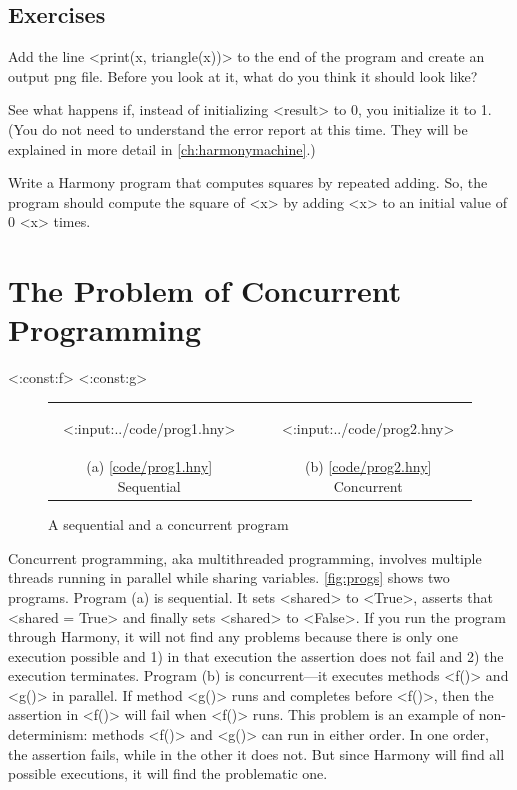 \documentclass{report}
\newcommand{\harmonylink}[1]{%
[\href{https://harmony.cs.cornell.edu/#1}{\underline{#1}}]%
}
\begin{document}
\section*{Exercises}
\begin{problems}
\item Add the line <{print(x, triangle(x))}> to the end of the
program and create an output png file.  Before you look at it, what
do you think it should look like?
\item See what happens if, instead of initializing <{result}> to 0,
you initialize it to 1.  (You do not need to understand the error report at this time.  They will be explained in more detail in \autoref{ch:harmonymachine}.)
\item Write a Harmony program that computes squares by repeated adding.  So, the program
should compute the square of <{x}> by adding <{x}> to an initial value of 0 <{x}> times.
\end{problems}

\chapter{The Problem of Concurrent Programming}
\label{ch:concurrent}

<{:const:f}>
<{:const:g}>

\begin{figure}[h]
\begin{center}
\begin{tabular}{ccc}
\begin{tcolorbox}[width=0.4\linewidth]
<{:input:../code/prog1.hny}>
\end{tcolorbox}
& \rule{0.05\linewidth}{0in} &
\begin{tcolorbox}[width=0.4\linewidth]
<{:input:../code/prog2.hny}>
\end{tcolorbox}
\\
(a) \harmonylink{code/prog1.hny} Sequential && (b) \harmonylink{code/prog2.hny} Concurrent
\end{tabular}
\end{center}
\caption{A sequential and a concurrent program}
\label{fig:progs}
\end{figure}

%

Concurrent programming, aka multithreaded programming, involves multiple
threads
%
running in parallel while sharing variables.
\autoref{fig:progs} shows two programs.  Program (a) is sequential.
It sets <{shared}> to <{True}>, asserts that
<{shared = True}> and finally sets <{shared}> to <{False}>.
If you run the program through Harmony, it will not find any problems
because there is only one execution possible and 1) in that execution
the assertion does not fail and 2) the execution terminates.
Program (b) is concurrent---it executes methods <{f()}> and
<{g()}> in parallel.
If method <{g()}> runs and completes before <{f()}>, then
the assertion in <{f()}> will fail when <{f()}> runs.
This problem is an example of non-determinism: methods <{f()}>
and <{g()}> can run in either order.
In one order, the assertion fails, while in the other it does not.
But since Harmony will find all possible executions, it will find
the problematic one.
\end{document}
